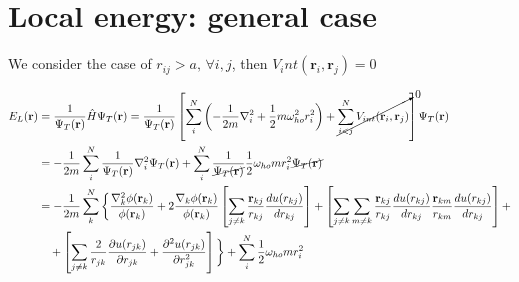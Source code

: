 \documentclass{article}
\begin{document}
\section{Local energy: general case}

We consider the case of $r_{ij}>a,\, \forall i,j$, then $V_int(\mathbf{r}_i,\mathbf{r}_j) = 0$

\begin{align*}
    E_L(\mathbf{r}) &= \frac{1}{\Psi_T(\mathbf{r})} \hat{H} \Psi_T(\mathbf{r}) = \frac{1}{\Psi_T(\mathbf{r})} \left[ \sum_i^N \left( -\frac{1}{2m} \nabla_{i}^2 + \frac{1}{2} m \omega_{ho}^2 r_i^2 \right)  + \cancelto{0}{\sum_{i<j}^{N} V_{int}({\mathbf{r}}_i,{\mathbf{r}}_j)} \right] \Psi_T(\mathbf{r}) \\
    &= -\frac{1}{2m} \sum_i^N \frac{1}{\Psi_T(\mathbf{r})} \nabla_{i}^2 \Psi_T(\mathbf{r}) + \sum_i^N \frac{1}{\cancel{\Psi_T(\mathbf{r})}} \frac{1}{2} \omega_{ho} m r_{i}^2 \cancel{\Psi_T(\mathbf{r})} \\
    &= -\frac{1}{2m} \sum_k^N \bigg\{ \frac{\nabla_k^2 \phi(\mathbf{r}_k)}{\phi(\mathbf{r}_k)} + 2 \frac{\nabla_k \phi(\mathbf{r}_k)}{\phi(\mathbf{r}_k)} \left[ \sum_{j\neq k} \frac{\mathbf{r}_{kj}}{r_{kj}} \frac{du(r_{kj})}{dr_{kj}} \right] + \left[ \sum_{j\neq k} \sum_{m \neq k} \frac{\mathbf{r}_{kj}}{r_{kj}} \frac{du(r_{kj})}{dr_{kj}} \frac{\mathbf{r}_{km}}{r_{km}} \frac{du(r_{kj})}{dr_{kj}} \right]  + \\
    &\quad + \left[ \sum_{j\neq k} \frac{2}{r_{jk}} \frac{\partial u(r_{jk})}{\partial r_{jk}} + \frac{\partial^2 u(r_{jk})}{\partial r_{jk}^2} \right] \bigg\} + \sum_i^N \frac{1}{2} \omega_{ho} m r_{i}^2
\end{align*}    
\end{document}
